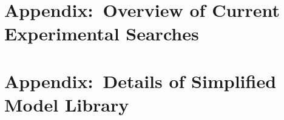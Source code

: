 \documentclass[a4paper,debug,notitlepage,nobib]{tufte-book}
\begin{document}
\chapter{Appendix:~Overview of Current Experimental Searches}
\label{sec:experimental_searches}


\chapter{Appendix:~Details of Simplified Model Library}
\label{sec:library}


%

%

%
% 
%
%
%
%
%
\printbibliography
\end{document}
